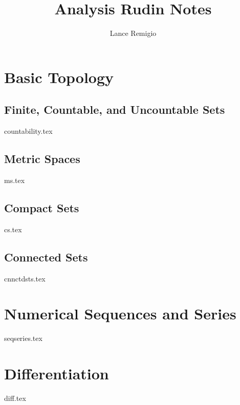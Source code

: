 \documentclass[11pt,a4paper]{book}
\title{Analysis Rudin Notes}
\author{Lance Remigio}
\begin{document}
\maketitle
\tableofcontents
\listoftheorems[ignoreall,show={theorem,defn}]

\chapter{Basic Topology}


\section{Finite, Countable, and Uncountable Sets}

{countability.tex}

\section{Metric Spaces}

{ms.tex}

\section{Compact Sets}

{cs.tex}

\section{Connected Sets}

{cnnctdsts.tex}

\chapter{Numerical Sequences and Series}

{seqseries.tex}

\chapter{Differentiation}

{diff.tex}
\end{document}
